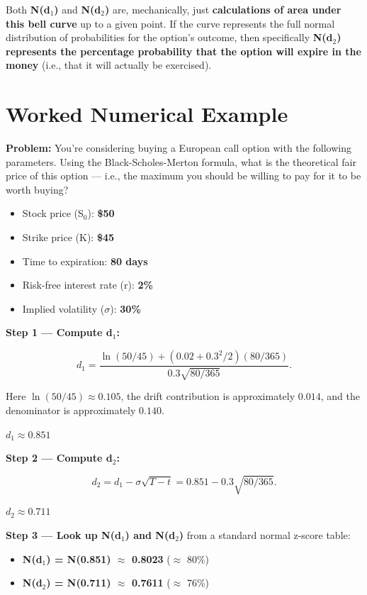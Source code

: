 \documentclass[12pt,openany]{book}
\theoremstyle{definition}
\theoremstyle{remark}
\begin{document}
Both \textbf{N(d\(_1\))} and \textbf{N(d\(_2\))} are, mechanically, just \textbf{calculations of area under this bell curve} up to a given point. If the curve represents the full normal distribution of probabilities for the option's outcome, then specifically \textbf{N(d\(_2\)) represents the percentage probability that the option will expire in the money} (i.e., that it will actually be exercised).

\section{Worked Numerical Example}

\textbf{Problem:} You're considering buying a European call option with the following parameters. Using the Black-Scholes-Merton formula, what is the theoretical fair price of this option --- i.e., the maximum you should be willing to pay for it to be worth buying?

\begin{itemize}
\item Stock price (S\(_0\)): \textbf{\$50}


\item Strike price (K): \textbf{\$45}


\item Time to expiration: \textbf{80 days}


\item Risk-free interest rate (r): \textbf{2\%}


\item Implied volatility (\(\sigma\)): \textbf{30\%}


\end{itemize}

\textbf{Step 1 --- Compute d\(_1\):}

\[
d_1=\frac{\ln(50/45)+(0.02+0.3^2/2)(80/365)}
          {0.3\sqrt{80/365}}.
\]

Here \(\ln(50/45)\approx0.105\), the drift contribution is approximately
\(0.014\), and the denominator is approximately \(0.140\).

\(d_1\approx0.851\)

\textbf{Step 2 --- Compute d\(_2\):}

\[
d_2=d_1-\sigma\sqrt{T-t}
   =0.851-0.3\sqrt{80/365}.
\]

\(d_2\approx0.711\)

\textbf{Step 3 --- Look up N(d\(_1\)) and N(d\(_2\))} from a standard normal z-score table:

\begin{itemize}
\item \textbf{N(d\(_1\)) = N(0.851) \(\approx\) 0.8023} (\(\approx\) 80\%)


\item \textbf{N(d\(_2\)) = N(0.711) \(\approx\) 0.7611} (\(\approx\) 76\%)


\end{itemize}
\end{document}
